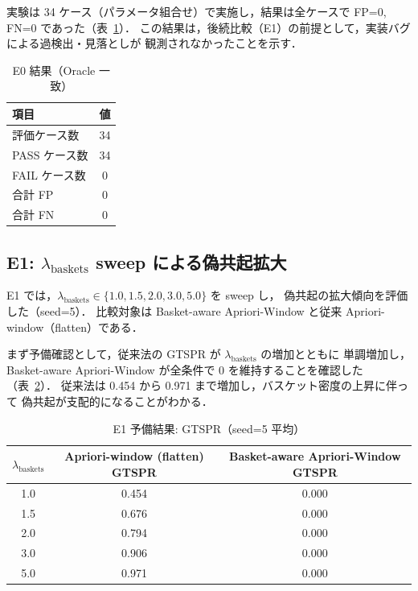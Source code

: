 実験は 34 ケース（パラメータ組合せ）で実施し，結果は全ケースで
FP=0, FN=0 であった（表~\ref{tab:e0_summary}）．
この結果は，後続比較（E1）の前提として，実装バグによる過検出・見落としが
観測されなかったことを示す．

\begin{table}[t]
\caption{E0 結果（Oracle 一致）}
\label{tab:e0_summary}
\centering
\begin{tabular}{lc}
\toprule
項目 & 値 \\
\midrule
評価ケース数 & 34 \\
PASS ケース数 & 34 \\
FAIL ケース数 & 0 \\
合計 FP & 0 \\
合計 FN & 0 \\
\bottomrule
\end{tabular}
\end{table}

\subsection{E1: $\lambda_{\text{baskets}}$ sweep による偽共起拡大}
\label{sec:exp_e1}

E1 では，$\lambda_{\text{baskets}} \in \{1.0,1.5,2.0,3.0,5.0\}$ を sweep し，
偽共起の拡大傾向を評価した（seed=5）．
比較対象は Basket-aware Apriori-Window と従来 Apriori-window（flatten）である．

まず予備確認として，従来法の GTSPR が $\lambda_{\text{baskets}}$ の増加とともに
単調増加し，Basket-aware Apriori-Window が全条件で 0 を維持することを確認した
（表~\ref{tab:prelim_gtspr}）．
従来法は 0.454 から 0.971 まで増加し，バスケット密度の上昇に伴って
偽共起が支配的になることがわかる．

\begin{table}[t]
\caption{E1 予備結果: GTSPR（seed=5 平均）}
\label{tab:prelim_gtspr}
\centering
\begin{tabular}{ccc}
\toprule
$\lambda_{\text{baskets}}$ & Apriori-window (flatten) GTSPR & Basket-aware Apriori-Window GTSPR \\
\midrule
1.0 & 0.454 & 0.000 \\
1.5 & 0.676 & 0.000 \\
2.0 & 0.794 & 0.000 \\
3.0 & 0.906 & 0.000 \\
5.0 & 0.971 & 0.000 \\
\bottomrule
\end{tabular}
\end{table}

